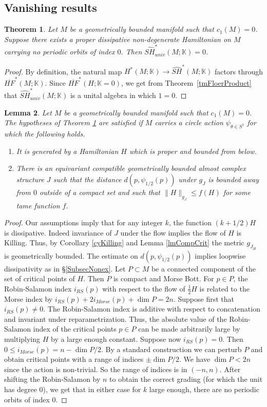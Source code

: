 \documentclass[11pt]{amsart}
\newcommand{\K}{\mathbb{K}}
\newtheorem{tm}{Theorem}[section]
\newtheorem{lm}[tm]{Lemma}
\theoremstyle{definition}
\theoremstyle{remark}
\begin{document}
\subsection{Vanishing results}
\begin{tm}\label{tmVanishing}
Let $M$ be a geometrically bounded manifold such that $c_1(M)=0$. Suppose there exists a proper dissipative non-degenerate Hamiltonian on $M$ carrying no periodic orbits of index $0$. Then $\widehat{SH}^*_{univ}(M;\K)=0$.
\end{tm}
\begin{proof}
By definition, the natural map $H^*(M;\K)\to\widehat{SH}^*(M;\K)$ factors through $\overline{HF}^*(M;\K)$. Since $\overline{HF}^*(H;\K=0)$, we get from Theorem~\ref{tmFloerProduct}  that $\widehat{SH}^*_{univ}(M;\K)$ is a unital algebra in which $1=0$.
\end{proof}
\begin{lm}\label{lmCircFukTriv}
Let $M$ be a geometrically bounded manifold such that $c_1(M)=0$. The hypotheses of Theorem \ref{tmVanishing} are satisfied if $M$ carries a circle action $\psi_{\theta\in S^1}$ for which the following holds.
\begin{enumerate}
    \item It is generated by a Hamiltonian $H$ which is proper and bounded from below.
    \item There is an equivariant compatible geometrically bounded almost complex structure $J$ such that the distance $d(p,\psi_{1/2}(p))$ under $g_J$ is bounded away from $0$ outside of a compact set and such that $\|H\|_{g_J}\leq f(H)$ for some tame function $f$.
    \end{enumerate}
\end{lm}
\begin{proof}
Our assumptions imply that for any integer $k$, the function $(k+1/2)H$ is dissipative. Indeed invariance of $J$ under the flow implies the flow of $H$ is Killing. Thus, by Corollary \ref{cyKilling} and Lemma \ref{lmCompCrit}  the metric $g_{J_H}$ is geometrically bounded. The estimate on $d(p,\psi_{1/2}(p))$ implies loopwise dissipativity as in \S \ref{SubsecNonex}. Let $P\subset M$ be a connected component of the set of critical points of $H$. Then $P$ is compact and Morse Bott. For $p\in P$, the Robin-Salamon index $i_{RS}(p)$ with respect to the flow of $\frac12H$ is related to the Morse index by $i_{RS}(p)+2i_{Morse}(p)+\dim P=2n$. Suppose first that $i_{RS}(p)\neq 0$. The Robin-Salamon index is additive with respect to concatenation and invariant under reparametrization. Thus, the absolute value of the Robin-Salamon index of the critical points $p\in P$ can be made arbitrarily large by multiplying $H$ by a large enough constant. Suppose now $i_{RS}(p)=0$. Then $0\leq i_{Morse}(p)=n-\dim P/2.$ By a standard construction we can perturb $P$ and obtain critical points with a range of indices $\pm \dim P/2.$ We have $\dim P< 2n$ since the action is non-trivial. So the range of indices is in $(-n,n)$.   After shifting the Robin-Salamon by $n$ to obtain the correct grading (for which the unit has degree $0$), we get that in either case for $k$ large enough, there are no periodic orbits of index $0$.
\end{proof}
\end{document}
